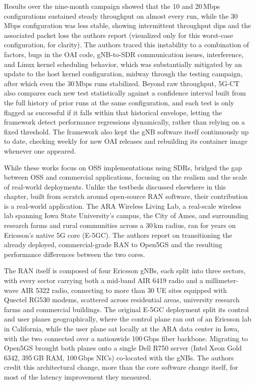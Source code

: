 Results over the nine-month campaign showed that the 10 and 20\,Mbps configurations sustained steady throughput on almost every run, while the 30\,Mbps configuration was less stable, showing intermittent throughput dips and the associated packet loss the authors report (visualized only for this worst-case configuration, for clarity). The authors traced this instability to a combination of factors, bugs in the \gls{OAI} code, gNB-to-\gls{SDR} communication issues, interference, and Linux kernel scheduling behavior, which was substantially mitigated by an update to the host kernel configuration, midway through the testing campaign, after which even the 30\,Mbps runs stabilized. Beyond raw throughput, 5G-CT also compares each new test statistically against a confidence interval built from the full history of prior runs at the same configuration, and each test is only flagged as successful if it falls within that historical envelope, letting the framework detect performance regressions dynamically, rather than relying on a fixed threshold. The framework also kept the \gls{gNB} software itself continuously up to date, checking weekly for new \gls{OAI} releases and rebuilding its container image whenever one appeared.

While these works focus on \gls{OSS} implementations using \glspl{SDR}, \textcite{zu2025realworld} bridged the gap between \gls{OSS} and commercial applications, focusing on the realism and the scale of real-world deployments. Unlike the testbeds discussed elsewhere in this chapter, built from scratch around open-source \gls{RAN} software, their contribution is a real-world application. The ARA Wireless Living Lab, a real-scale wireless lab spanning Iowa State University's campus, the City of Ames, and surrounding research farms and rural communities across a 30\,km radius, ran for years on Ericsson's native 5G core (E-5GC). The authors report on transitioning the already deployed, commercial-grade \gls{RAN} to Open5GS and the resulting performance differences between the two cores.

The \gls{RAN} itself is composed of four Ericsson \glspl{gNB}, each split into three sectors, with every sector carrying both a mid-band AIR 6419 radio and a millimeter-wave AIR 5322 radio, connecting to more than 30 \gls{UE} sites equipped with Quectel RG530 modems, scattered across residential areas, university research farms and commercial buildings. The original E-5GC deployment split its control and user planes geographically, where the control plane ran out of an Ericsson lab in California, while the user plane sat locally at the ARA data center in Iowa, with the two connected over a nationwide 100\,Gbps fiber backbone. Migrating to Open5GS brought both planes onto a single Dell R750 server (Intel Xeon Gold 6342, 395\,GB RAM, 100\,Gbps NICs) co-located with the \glspl{gNB}. The authors credit this architectural change, more than the core software change itself, for most of the latency improvement they measured.

